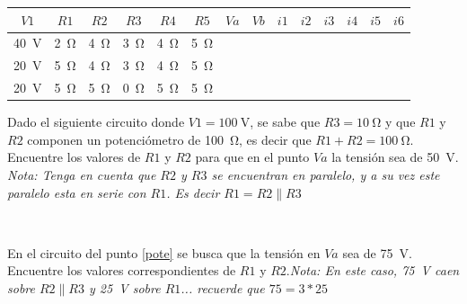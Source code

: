 \documentclass{article}
\begin{document}
\begin{enumerate}[label=\textbf{A.\arabic*}]
\begin{tabular}{|c|c|c|c|c|c|c|c|c|c|c|c|c|c|}
	\hline
	\rowcolor{headergray}
	${V1}$&${R1} $&${R2} $&$ {R3} $&${R4}$&${R5}$&${Va}$ &${Vb} $&$ {{i}1} $&$ {{i}2} $&$ {{i}3}$&$ {{i}4}$&$ {{i}5}$&$ {{i}6}$\\ \hline
	\SI{40}{\volt}&\SI{2}{\ohm}&\SI{4}{\ohm}&\SI{3}{\ohm}&\SI{4}{\ohm}&\SI{5}{\ohm}& &&&&&&& \\ \hline
	\SI{20}{\volt}&\SI{5}{\ohm}&\SI{4}{\ohm}&\SI{3}{\ohm}&\SI{4}{\ohm}&\SI{5}{\ohm}& &&&&&&& \\ \hline
	\SI{20}{\volt}&\SI{5}{\ohm}&\SI{5}{\ohm}&\SI{0}{\ohm}&\SI{5}{\ohm}&\SI{5}{\ohm}& &&&&&&& \\ \hline
	
\end{tabular}


\begin{minipage}{.55\textwidth}
	
	\item \label{pote} Dado el siguiente circuito donde $V1=\SI{100}{\volt}$, se sabe que $R3=\SI{10}{\ohm}$ y que $R1$ y $R2$ componen un potenciómetro de \SI{100}{\ohm}, es decir que $R1+R2=\SI{100}{\ohm}$. Encuentre los valores de $R1$ y $R2$ para que en el punto $Va$ la tensión sea de \SI{50}{\volt}. \textit{Nota: Tenga en cuenta que $R2$ y $R3$ se encuentran en paralelo, y a su vez este paralelo esta en serie con $R1$. Es decir $R1=R2\mathbin{\|}R3$} \\
	
\end{minipage}
\begin{minipage}{.10\textwidth}
\end{minipage}
\\
\item En el circuito del punto \ref{pote} se busca que la tensión en $Va$ sea de \SI{75}{\volt}. Encuentre los valores correspondientes de $R1$ y $R2$.\textit{Nota: En este caso, \SI{75}{\volt} caen sobre $R2\mathbin{\|}R3$ y \SI{25}{\volt} sobre $R1$... recuerde que $75=3*25$ } 
    \end{enumerate}
\clearpage
\end{document}
